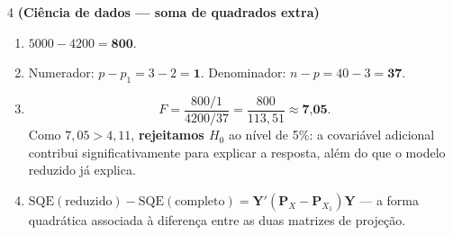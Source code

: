 \documentclass[11pt]{article}
\begin{document}
\begin{questao}{4} \textbf{(Ciência de dados --- soma de quadrados extra)}
\end{questao}
\begin{solucao}
\begin{enumerate}[label=(\alph*)]
  \item $5000 - 4200 = \textbf{800}$.
  \item Numerador: $p - p_1 = 3-2 = \textbf{1}$. Denominador: $n-p = 40-3=\textbf{37}$.
  \item
  $$
  F = \frac{800/1}{4200/37} = \frac{800}{113{,}51} \approx \textbf{7{,}05}.
  $$
  Como $7{,}05 > 4{,}11$, \textbf{rejeitamos $H_0$} ao nível de 5\%: a covariável adicional
  contribui significativamente para explicar a resposta, além do que o modelo reduzido já
  explica.
  \item $\mathrm{SQE}(\text{reduzido}) - \mathrm{SQE}(\text{completo}) =
    \mathbf{Y}'(\mathbf{P}_X - \mathbf{P}_{X_1})\mathbf{Y}$ --- a forma quadrática associada à
    diferença entre as duas matrizes de projeção.
\end{enumerate}
\end{solucao}
\end{document}
